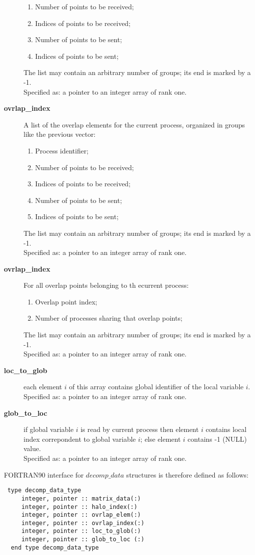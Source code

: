 \begin{description}
\begin{enumerate}
\item Number of points to be received;
\item Indices of points to be received;
\item Number of points to be sent;
\item Indices of points to be sent;
\end{enumerate}
The list may contain an arbitrary number of groups; its end is marked
by a -1.\\
Specified as: a pointer to an integer array of rank one.
\item [{\bf ovrlap\_index}] A list of the overlap elements for the
current process, organized in groups like the previous vector:
\begin{enumerate}
\item Process identifier;
\item Number of points to be received;
\item Indices of points to be received;
\item Number of points to be sent;
\item Indices of points to be sent;
\end{enumerate}
The list may contain an arbitrary number of groups; its end is marked
by a -1.\\
Specified as: a pointer to an integer array  of rank one.
\item [{\bf ovrlap\_index}] For all overlap points belonging to th
ecurrent process:
\begin{enumerate}
\item  Overlap point index;
\item  Number of processes sharing that overlap points;
\end{enumerate}
The list may contain an arbitrary number of groups; its end is marked
by a -1.\\
Specified as: a pointer to an integer array of rank one.
\item[{\bf loc\_to\_glob}] each element $i$ of this array contains
global identifier of the local variable $i$.\\
Specified as: a pointer to an integer array of rank one.
\item[{\bf glob\_to\_loc}]  if global variable $i$ is read by current
process then element $i$ contains local index correpondent to global variable $i$;
else element $i$ contains -1 (NULL) value.\\
Specified as: a pointer to an integer array of rank one.
\end{description}
FORTRAN90 interface for $decomp\_data$ structures is therefore defined
as follows:
\begin{verbatim}
 type decomp_data_type
     integer, pointer :: matrix_data(:)
     integer, pointer :: halo_index(:)
     integer, pointer :: ovrlap_elem(:)
     integer, pointer :: ovrlap_index(:)
     integer, pointer :: loc_to_glob(:)
     integer, pointer :: glob_to_loc (:)
  end type decomp_data_type
\end{verbatim}

